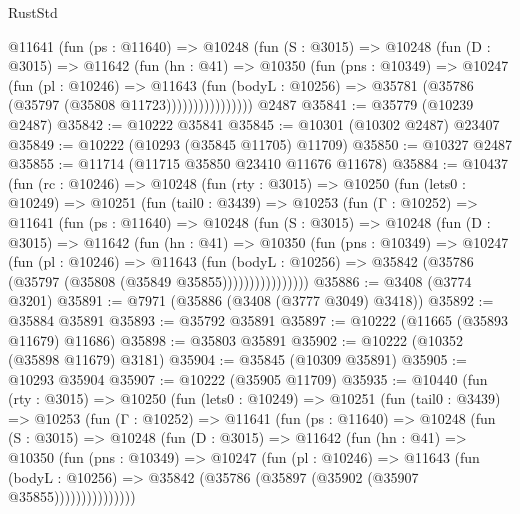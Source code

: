 \begin{lexlean}{RustStd}
\begin{coremodule}
              @11641
                (fun (ps : @11640) =>
                @10248
                  (fun (S : @3015) =>
                  @10248
                    (fun (D : @3015) =>
                    @11642
                      (fun (hn : @41) =>
                      @10350
                        (fun (pns : @10349) =>
                        @10247
                          (fun (pl : @10246) =>
                          @11643
                            (fun (bodyL : @10256) =>
                            @35781 (@35786 (@35797 (@35808 @11723))))))))))))))))
    @2487
@35841 := @35779 (@10239 @2487)
@35842 := @10222 @35841
@35845 := @10301 (@10302 @2487) @23407
@35849 := @10222 (@10293 (@35845 @11705) @11709)
@35850 := @10327 @2487
@35855 := @11714 (@11715 @35850 @23410 @11676 @11678)
@35884 := @10437
    (fun (rc : @10246) =>
    @10248
      (fun (rty : @3015) =>
      @10250
        (fun (lets0 : @10249) =>
        @10251
          (fun (tail0 : @3439) =>
          @10253
            (fun (Γ : @10252) =>
            @11641
              (fun (ps : @11640) =>
              @10248
                (fun (S : @3015) =>
                @10248
                  (fun (D : @3015) =>
                  @11642
                    (fun (hn : @41) =>
                    @10350
                      (fun (pns : @10349) =>
                      @10247
                        (fun (pl : @10246) =>
                        @11643
                          (fun (bodyL : @10256) =>
                          @35842 (@35786 (@35797 (@35808 (@35849 @35855))))))))))))))))
@35886 := @3408 (@3774 @3201)
@35891 := @7971 (@35886 (@3408 (@3777 @3049) @3418))
@35892 := @35884 @35891
@35893 := @35792 @35891
@35897 := @10222 (@11665 (@35893 @11679) @11686)
@35898 := @35803 @35891
@35902 := @10222 (@10352 (@35898 @11679) @3181)
@35904 := @35845 (@10309 @35891)
@35905 := @10293 @35904
@35907 := @10222 (@35905 @11709)
@35935 := @10440
    (fun (rty : @3015) =>
    @10250
      (fun (lets0 : @10249) =>
      @10251
        (fun (tail0 : @3439) =>
        @10253
          (fun (Γ : @10252) =>
          @11641
            (fun (ps : @11640) =>
            @10248
              (fun (S : @3015) =>
              @10248
                (fun (D : @3015) =>
                @11642
                  (fun (hn : @41) =>
                  @10350
                    (fun (pns : @10349) =>
                    @10247
                      (fun (pl : @10246) =>
                      @11643
                        (fun (bodyL : @10256) =>
                        @35842 (@35786 (@35897 (@35902 (@35907 @35855)))))))))))))))

\end{coremodule}
\end{lexlean}
